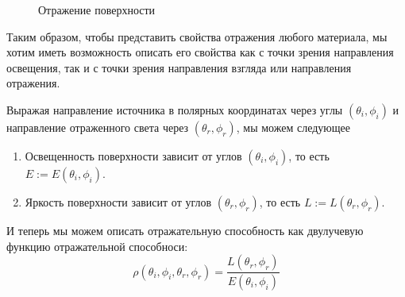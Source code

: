 \begin{figure}[h]
  \begin{center}
    \caption{Отражение поверхности}
    \label{surface_reflection}
  \end{center}
\end{figure}

Таким образом, чтобы представить свойства отражения любого материала,
мы хотим иметь возможность описать его свойства как с точки зрения
направления освещения, так и с точки зрения направления взгляда или направления отражения.

Выражая направление источника в полярных координатах через углы $(\theta_i,\phi_i)$ и
направление отраженного света через $(\theta_r,\phi_r)$, мы можем следующее
\begin{enumerate}
  \item Освещенность поверхности зависит от углов $(\theta_i,\phi_i)$, то есть $E:=E(\theta_i,\phi_i)$.
  \item Яркость поверхности зависит от углов $(\theta_r,\phi_r)$, то есть $L:=L(\theta_r,\phi_r)$.
\end{enumerate}

И теперь мы можем описать отражательную способность как двулучевую функцию отражательной
способноси:
\begin{equation}
  \rho(\theta_i,\phi_i,\theta_r,\phi_r)=\frac{L(\theta_r,\phi_r)}{E(\theta_i,\phi_i)}
\end{equation}

